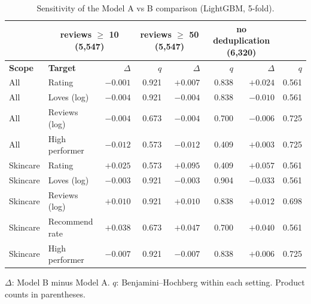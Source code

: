 \begin{table}[htbp]
\centering
\small
\begin{tabular}{|l|l|r|r|r|r|r|r|}
\hline
\rowcolor{headfill} \multicolumn{2}{|c|}{} & \multicolumn{2}{c|}{\textbf{reviews $\geq$ 10 (5,547)}} & \multicolumn{2}{c|}{\textbf{reviews $\geq$ 50 (5,547)}} & \multicolumn{2}{c|}{\textbf{no deduplication (6,320)}} \\
\hline
\rowcolor{headfill} \textbf{Scope} & \textbf{Target} & \textbf{$\Delta$} & \textbf{$q$} & \textbf{$\Delta$} & \textbf{$q$} & \textbf{$\Delta$} & \textbf{$q$} \\
\hline
All & Rating & $-0.001$ & 0.921 & $+0.007$ & 0.838 & $+0.024$ & 0.561 \\
\hline
All & Loves (log) & $-0.004$ & 0.921 & $-0.004$ & 0.838 & $-0.010$ & 0.561 \\
\hline
All & Reviews (log) & $-0.004$ & 0.673 & $-0.004$ & 0.700 & $-0.006$ & 0.725 \\
\hline
All & High performer & $-0.012$ & 0.573 & $-0.012$ & 0.409 & $+0.003$ & 0.725 \\
\hline
\hline
Skincare & Rating & $+0.025$ & 0.573 & $+0.095$ & 0.409 & $+0.057$ & 0.561 \\
\hline
Skincare & Loves (log) & $-0.003$ & 0.921 & $-0.003$ & 0.904 & $-0.033$ & 0.561 \\
\hline
Skincare & Reviews (log) & $+0.010$ & 0.921 & $+0.010$ & 0.838 & $+0.012$ & 0.698 \\
\hline
Skincare & Recommend rate & $+0.038$ & 0.673 & $+0.047$ & 0.700 & $+0.040$ & 0.561 \\
\hline
Skincare & High performer & $-0.007$ & 0.921 & $-0.007$ & 0.838 & $+0.006$ & 0.725 \\
\hline
\end{tabular}
\par\smallskip
\parbox{0.95\linewidth}{\footnotesize $\Delta$: Model B minus Model A. $q$: Benjamini--Hochberg within each setting. Product counts in parentheses.}
\caption{Sensitivity of the Model A vs B comparison (LightGBM, 5-fold).}
\label{tab:sensitivity}
\end{table}
